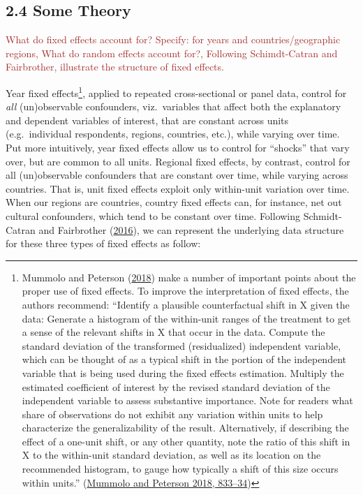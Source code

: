 \documentclass[
]{article}
\begin{document}
\hypertarget{some-theory}{%
\subsection{2.4 Some Theory}\label{some-theory}}

\textcolor{brown}{What do fixed effects account for? Specify: for years and countries/geographic regions, What do random effects account for?, Following Schimdt-Catran and Fairbrother, illustrate the structure of fixed effects.}

Year fixed effects\footnote{Mummolo and Peterson
  (\protect\hyperlink{ref-mummolo2018improving}{2018}) make a number of
  important points about the proper use of fixed effects. To improve the
  interpretation of fixed effects, the authors recommend: ``Identify a
  plausible counterfactual shift in X given the data: Generate a
  histogram of the within-unit ranges of the treatment to get a sense of
  the relevant shifts in X that occur in the data. Compute the standard
  deviation of the transformed (residualized) independent variable,
  which can be thought of as a typical shift in the portion of the
  independent variable that is being used during the fixed effects
  estimation. Multiply the estimated coefficient of interest by the
  revised standard deviation of the independent variable to assess
  substantive importance. Note for readers what share of observations do
  not exhibit any variation within units to help characterize the
  generalizability of the result. Alternatively, if describing the
  effect of a one-unit shift, or any other quantity, note the ratio of
  this shift in X to the within-unit standard deviation, as well as its
  location on the recommended histogram, to gauge how typically a shift
  of this size occurs within units.''
  (\protect\hyperlink{ref-mummolo2018improving}{Mummolo and Peterson
  2018, 833--34})}, applied to repeated cross-sectional or panel data,
control for \emph{all} (un)observable confounders, viz.~variables that
affect both the explanatory and dependent variables of interest, that
are constant across units (e.g.~individual respondents, regions,
countries, etc.), while varying over time. Put more intuitively, year
fixed effects allow us to control for ``shocks'' that vary over, but are
common to all units. Regional fixed effects, by contrast, control for
all (un)observable confounders that are constant over time, while
varying across countries. That is, unit fixed effects exploit only
within-unit variation over time. When our regions are countries, country
fixed effects can, for instance, net out cultural confounders, which
tend to be constant over time. Following Schmidt-Catran and Fairbrother
(\protect\hyperlink{ref-schmidt2016random}{2016}), we can represent the
underlying data structure for these three types of fixed effects as
follow:
\end{document}
